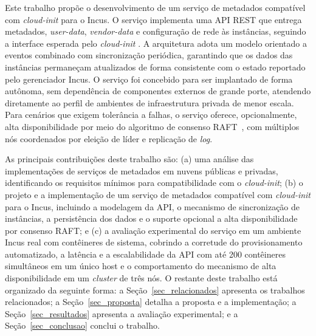 Este trabalho propõe o desenvolvimento de um serviço de metadados compatível com \textit{cloud-init} para o Incus. O serviço implementa uma API REST que entrega metadados, \textit{user-data}, \textit{vendor-data} e configuração de rede às instâncias, seguindo a interface esperada pelo \textit{cloud-init} \citep{cloudinit2024}. A arquitetura adota um modelo orientado a eventos combinado com sincronização periódica, garantindo que os dados das instâncias permaneçam atualizados de forma consistente com o estado reportado pelo gerenciador Incus. O serviço foi concebido para ser implantado de forma autônoma, sem dependência de componentes externos de grande porte, atendendo diretamente ao perfil de ambientes de infraestrutura privada de menor escala. Para cenários que exigem tolerância a falhas, o serviço oferece, opcionalmente, alta disponibilidade por meio do algoritmo de consenso RAFT~\citep{ongaro2014raft}, com múltiplos nós coordenados por eleição de líder e replicação de \textit{log}.

As principais contribuições deste trabalho são: (a) uma análise das implementações de serviços de metadados em nuvens públicas e privadas, identificando os requisitos mínimos para compatibilidade com o \textit{cloud-init}; (b) o projeto e a implementação de um serviço de metadados compatível com \textit{cloud-init} para o Incus, incluindo a modelagem da API, o mecanismo de sincronização de instâncias, a persistência dos dados e o suporte opcional a alta disponibilidade por consenso RAFT; e (c) a avaliação experimental do serviço em um ambiente Incus real com contêineres de sistema, cobrindo a corretude do provisionamento automatizado, a latência e a escalabilidade da API com até 200 contêineres simultâneos em um único host e o comportamento do mecanismo de alta disponibilidade em um \textit{cluster} de três nós. O restante deste trabalho está organizado da seguinte forma: a Seção~\ref{sec_relacionados} apresenta os trabalhos relacionados; a Seção~\ref{sec_proposta} detalha a proposta e a implementação; a Seção~\ref{sec_resultados} apresenta a avaliação experimental; e a Seção~\ref{sec_conclusao} conclui o trabalho.
